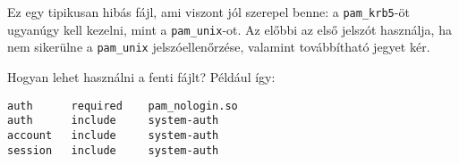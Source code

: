 Ez egy tipikusan hibás fájl, ami viszont jól szerepel benne: a \texttt{pam\_krb5}-öt ugyanúgy kell kezelni, mint a
\texttt{pam\_unix}-ot. Az előbbi az első jelszót használja, ha nem sikerülne a \texttt{pam\_unix} jelszóellenőrzése,
valamint továbbítható jegyet kér.

Hogyan lehet használni a fenti fájlt? Például így:

\begin{Verbatim}[frame=single]
auth      required    pam_nologin.so
auth      include     system-auth
account   include     system-auth
session   include     system-auth
\end{Verbatim}



